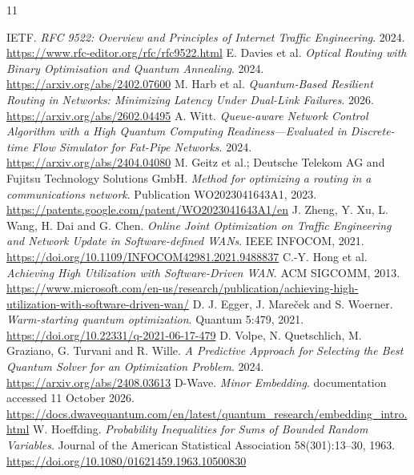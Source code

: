 \documentclass[11pt,a4paper]{article}
\newcommand{\1}{\mathbf{1}}
\begin{document}
\begin{thebibliography}{11}\small\raggedright\setlength{\parskip}{0pt}\setlength{\itemsep}{3pt}
 IETF. \emph{RFC 9522: Overview and Principles of Internet Traffic Engineering}. 2024. \url{https://www.rfc-editor.org/rfc/rfc9522.html}
 E. Davies et al. \emph{Optical Routing with Binary Optimisation and Quantum Annealing}. 2024. \url{https://arxiv.org/abs/2402.07600}
 M. Harb et al. \emph{Quantum-Based Resilient Routing in Networks: Minimizing Latency Under Dual-Link Failures}. 2026. \url{https://arxiv.org/abs/2602.04495}
 A. Witt. \emph{Queue-aware Network Control Algorithm with a High Quantum Computing Readiness---Evaluated in Discrete-time Flow Simulator for Fat-Pipe Networks}. 2024. \url{https://arxiv.org/abs/2404.04080}
 M. Geitz et al.; Deutsche Telekom AG and Fujitsu Technology Solutions GmbH. \emph{Method for optimizing a routing in a communications network}. Publication WO2023041643A1, 2023. \url{https://patents.google.com/patent/WO2023041643A1/en}
 J. Zheng, Y. Xu, L. Wang, H. Dai and G. Chen. \emph{Online Joint Optimization on Traffic Engineering and Network Update in Software-defined WANs}. IEEE INFOCOM, 2021. \url{https://doi.org/10.1109/INFOCOM42981.2021.9488837}
 C.-Y. Hong et al. \emph{Achieving High Utilization with Software-Driven WAN}. ACM SIGCOMM, 2013. \url{https://www.microsoft.com/en-us/research/publication/achieving-high-utilization-with-software-driven-wan/}
 D. J. Egger, J. Mare\v{c}ek and S. Woerner. \emph{Warm-starting quantum optimization}. Quantum 5:479, 2021. \url{https://doi.org/10.22331/q-2021-06-17-479}
 D. Volpe, N. Quetschlich, M. Graziano, G. Turvani and R. Wille. \emph{A Predictive Approach for Selecting the Best Quantum Solver for an Optimization Problem}. 2024. \url{https://arxiv.org/abs/2408.03613}
 D-Wave. \emph{Minor Embedding}. documentation accessed 11 October 2026. \url{https://docs.dwavequantum.com/en/latest/quantum_research/embedding_intro.html}
 W. Hoeffding. \emph{Probability Inequalities for Sums of Bounded Random Variables}. Journal of the American Statistical Association 58(301):13--30, 1963. \url{https://doi.org/10.1080/01621459.1963.10500830}
\end{thebibliography}
\end{document}
